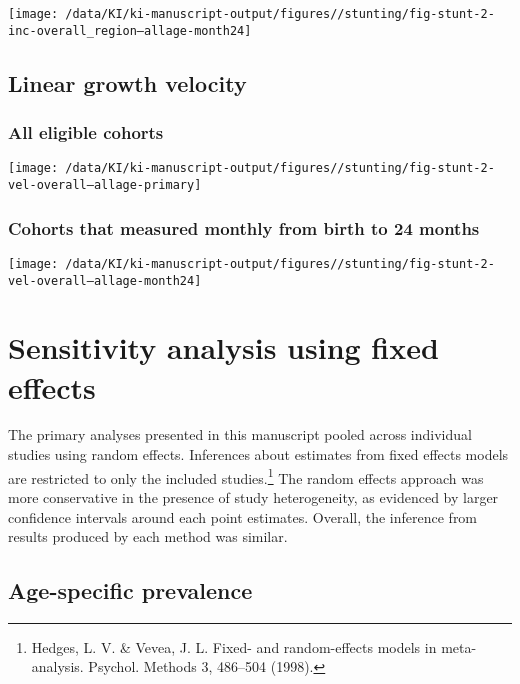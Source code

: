 \documentclass[
  9pt,
]{book}
\begin{document}
\texttt{[image: /data/KI/ki-manuscript-output/figures//stunting/fig-stunt-2-inc-overall\_region--allage-month24]}

\hypertarget{linear-growth-velocity}{%
\section{Linear growth velocity}\label{linear-growth-velocity}}

\hypertarget{all-eligible-cohorts-3}{%
\subsection{All eligible cohorts}\label{all-eligible-cohorts-3}}

\texttt{[image: /data/KI/ki-manuscript-output/figures//stunting/fig-stunt-2-vel-overall--allage-primary]}

\hypertarget{cohorts-that-measured-monthly-from-birth-to-24-months-3}{%
\subsection{Cohorts that measured monthly from birth to 24 months}\label{cohorts-that-measured-monthly-from-birth-to-24-months-3}}

\texttt{[image: /data/KI/ki-manuscript-output/figures//stunting/fig-stunt-2-vel-overall--allage-month24]}

\hypertarget{fixed-effects}{%
\chapter{Sensitivity analysis using fixed effects}\label{fixed-effects}}

The primary analyses presented in this manuscript pooled across individual studies using random effects. Inferences about estimates from fixed effects models are restricted to only the included studies.\footnote{Hedges, L. V. \& Vevea, J. L. Fixed- and random-effects models in meta-analysis. Psychol. Methods 3, 486--504 (1998).} The random effects approach was more conservative in the presence of study heterogeneity, as evidenced by larger confidence intervals around each point estimates. Overall, the inference from results produced by each method was similar.

\hypertarget{age-specific-prevalence-2}{%
\section{Age-specific prevalence}\label{age-specific-prevalence-2}}
\end{document}
